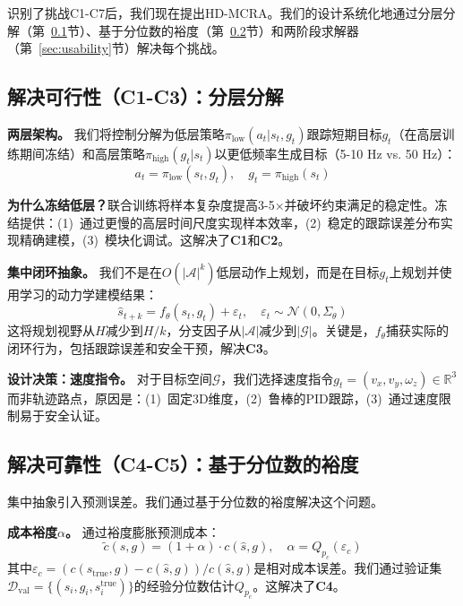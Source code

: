 \documentclass{article}
\begin{document}
识别了挑战C1-C7后，我们现在提出HD-MCRA。我们的设计系统化地通过分层分解（第~\ref{sec:feasibility}节）、基于分位数的裕度（第~\ref{sec:reliability}节）和两阶段求解器（第~\ref{sec:usability}节）解决每个挑战。

\subsection{解决可行性（C1-C3）：分层分解}
\label{sec:feasibility}

\textbf{两层架构。}
我们将控制分解为低层策略$\pi_{\text{low}}(a_t|s_t,g_t)$跟踪短期目标$g_t$（在高层训练期间冻结）和高层策略$\pi_{\text{high}}(g_t|s_t)$以更低频率生成目标（5-10 Hz vs. 50 Hz）：
\begin{equation}
a_t = \pi_{\text{low}}(s_t, g_t), \quad g_t = \pi_{\text{high}}(s_t)
\end{equation}

\textbf{为什么冻结低层？}联合训练将样本复杂度提高3-5$\times$并破坏约束满足的稳定性。冻结提供：(1)~通过更慢的高层时间尺度实现样本效率，(2)~稳定的跟踪误差分布实现精确建模，(3)~模块化调试。这解决了\textbf{C1}和\textbf{C2}。

\textbf{集中闭环抽象。}
我们不是在$O(|\mathcal{A}|^k)$低层动作上规划，而是在目标$g_t$上规划并使用学习的动力学建模结果：
\begin{equation}
\hat{s}_{t+k} = f_{\theta}(s_t, g_t) + \varepsilon_t, \quad \varepsilon_t \sim \mathcal{N}(0, \Sigma_{\theta})
\end{equation}
这将规划视野从$H$减少到$H/k$，分支因子从$|\mathcal{A}|$减少到$|\mathcal{G}|$。关键是，$f_{\theta}$捕获实际的闭环行为，包括跟踪误差和安全干预，解决\textbf{C3}。

\textbf{设计决策：速度指令。}
对于目标空间$\mathcal{G}$，我们选择速度指令$g_t=(v_x,v_y,\omega_z)\in\mathbb{R}^3$而非轨迹路点，原因是：(1)~固定3D维度，(2)~鲁棒的PID跟踪，(3)~通过速度限制易于安全认证。

\subsection{解决可靠性（C4-C5）：基于分位数的裕度}
\label{sec:reliability}

集中抽象引入预测误差。我们通过基于分位数的裕度解决这个问题。

\textbf{成本裕度$\alpha$。}
通过裕度膨胀预测成本：
\begin{equation}
\tilde{c}(s,g) = (1+\alpha)\cdot c(\hat{s},g), \quad \alpha = Q_{p_c}(\varepsilon_c)
\end{equation}
其中$\varepsilon_c = (c(s_{\text{true}},g) - c(\hat{s},g))/c(\hat{s},g)$是相对成本误差。我们通过验证集$\mathcal{D}_{\text{val}}=\{(s_i,g_i,s_i^{\text{true}})\}$的经验分位数估计$Q_{p_c}$。这解决了\textbf{C4}。
\end{document}
